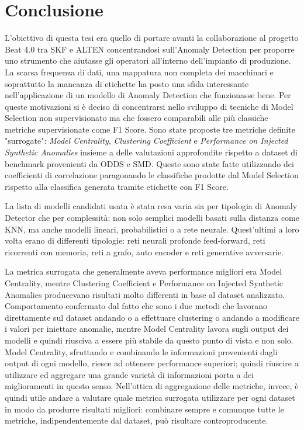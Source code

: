 \chapter{Conclusione}
\label{chap:conclusion}
L'obiettivo di questa tesi era quello di portare avanti la collaborazione al progetto Beat 4.0 tra SKF e ALTEN concentrandosi sull'Anomaly Detection per proporre uno strumento che aiutasse gli operatori all'interno dell'impianto di produzione. La scarsa frequenza di dati, una mappatura non completa dei macchinari e soprattutto la mancanza di etichette ha posto una sfida interessante nell'applicazione di un modello di Anomaly Detection che funzionasse bene.
Per queste motivazioni si è deciso di concentrarsi nello sviluppo di tecniche di Model Selection non supervisionato ma che fossero comparabili alle più classiche metriche supervisionate come F1 Score.
Sono state proposte tre metriche definite "surrogate": \textit{Model Centrality}, \textit{Clustering Coefficient} e \textit{Performance on Injected Synthetic Anomalies} insieme a delle valutazioni approfondite rispetto a dataset di benchmark provenienti da ODDS e SMD. Queste sono state fatte utilizzando dei coefficienti di correlazione paragonando le classifiche prodotte dal Model Selection rispetto alla classifica generata tramite etichette con F1 Score.

La lista di modelli candidati usata è stata resa varia sia per tipologia di Anomaly Detector che per complessità: non solo semplici modelli basati sulla distanza come KNN, ma anche modelli lineari, probabilistici o a rete neurale. Quest'ultimi a loro volta erano di differenti tipologie: reti neurali profonde feed-forward, reti ricorrenti con memoria, reti a grafo, auto encoder e reti generative avversarie.

La metrica surrogata che generalmente aveva performance migliori era Model Centrality, mentre Clustering Coefficient e Performance on Injected Synthetic Anomalies producevano risultati molto differenti in base al dataset analizzato. Comportamento confermato dal fatto che sono i due metodi che lavorano direttamente sul dataset andando o a effettuare clustering o andando a modificare i valori per iniettare anomalie, mentre Model Centrality lavora sugli output dei modelli e quindi riusciva a essere più stabile da questo punto di vista e non solo. Model Centrality, sfruttando e combinando le informazioni provenienti dagli output di ogni modello, riesce ad ottenere performance superiori; quindi riuscire a utilizzare ed aggregare una grande varietà di informazioni porta a dei miglioramenti in questo senso.
Nell'ottica di aggregazione delle metriche, invece, è quindi utile andare a valutare quale metrica surrogata utilizzare per ogni dataset in modo da produrre risultati migliori: combinare sempre e comunque tutte le metriche, indipendentemente dal dataset, può risultare controproducente.


